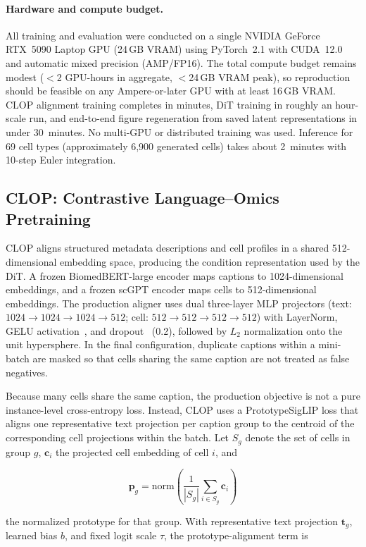 \documentclass[11pt,a4paper]{article}
\begin{document}
\paragraph{Hardware and compute budget.}
All training and evaluation were conducted on a single NVIDIA GeForce RTX~5090 Laptop GPU (24\,GB VRAM) using PyTorch~2.1 with CUDA~12.0 and automatic mixed precision (AMP/FP16). The total compute budget remains modest ($<$2 GPU-hours in aggregate, $<$24\,GB VRAM peak), so reproduction should be feasible on any Ampere-or-later GPU with at least 16\,GB VRAM. CLOP alignment training completes in minutes, DiT training in roughly an hour-scale run, and end-to-end figure regeneration from saved latent representations in under 30~minutes. No multi-GPU or distributed training was used. Inference for 69 cell types (approximately 6,900 generated cells) takes about 2~minutes with 10-step Euler integration.

\subsection{CLOP: Contrastive Language--Omics Pretraining}\label{sec:clop}

CLOP aligns structured metadata descriptions and cell profiles in a shared 512-dimensional embedding space, producing the condition representation used by the DiT. A frozen BiomedBERT-large encoder maps captions to 1024-dimensional embeddings, and a frozen scGPT encoder maps cells to 512-dimensional embeddings. The production aligner uses dual three-layer MLP projectors (text: $1024 \to 1024 \to 1024 \to 512$; cell: $512 \to 512 \to 512 \to 512$) with LayerNorm, GELU activation~\cite{ref-gelu}, and dropout~\cite{ref-dropout} (0.2), followed by $L_2$ normalization onto the unit hypersphere. In the final configuration, duplicate captions within a mini-batch are masked so that cells sharing the same caption are not treated as false negatives.

Because many cells share the same caption, the production objective is not a pure instance-level cross-entropy loss. Instead, CLOP uses a PrototypeSigLIP loss that aligns one representative text projection per caption group to the centroid of the corresponding cell projections within the batch. Let $S_g$ denote the set of cells in group $g$, $\mathbf{c}_i$ the projected cell embedding of cell $i$, and
\begin{linenomath}
\begin{equation}
\mathbf{p}_g = \mathrm{norm}\!\left(\frac{1}{|S_g|}\sum_{i \in S_g} \mathbf{c}_i\right)
\end{equation}
\end{linenomath}
the normalized prototype for that group. With representative text projection $\mathbf{t}_g$, learned bias $b$, and fixed logit scale $\tau$, the prototype-alignment term is
\end{document}

